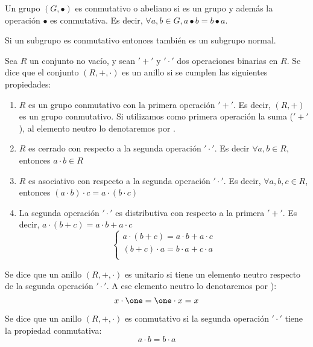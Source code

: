\begin{defn}
Un grupo $(G,\bullet)$ es conmutativo o abeliano si es un grupo y además la operación $\bullet$ es conmutativa. Es decir, $\forall a,b \in G, a\bullet b = b \bullet a$.
\end{defn}

\obs Si un subgrupo es conmutativo entonces también es un subgrupo normal.

\begin{defn}[Anillo]
Sea $R$ un conjunto no vacío, y sean $'+'$ y $'\cdot'$ dos operaciones binarias en $R$. Se dice que el conjunto $(R, +, \cdot )$ es un anillo si se cumplen las siguientes propiedades:

\begin{enumerate}
	\item $R$ es un grupo conmutativo con la primera operación $'+'$. Es decir, $(R,+)$ es un grupo conmutativo. Si utilizamos como primera operación la suma ($'+'$), al elemento neutro lo denotaremos por \zero.
	\item $R$ es cerrado con respecto a la segunda operación $'\cdot'$. Es decir $\forall a,b \in R$, entonces $a \cdot b \in R$
	\item $R$ es asociativo con respecto a la segunda operación $'\cdot'$. Es decir, $\forall a,b,c \in R$, entonces $(a\cdot b) \cdot c = a \cdot (b \cdot c)$
	\item La segunda operación $'\cdot'$ es distributiva con respecto a la primera $'+'$. Es decir, $a \cdot (b+c) = a\cdot b + a \cdot c$
	\[
	\left\{ \begin{array}{c}
	a \cdot (b+c) = a\cdot b + a \cdot c \\
	(b+c) \cdot a = b\cdot a + c\cdot a \\
	\end{array}
	\right.
	\]
\end{enumerate}
\end{defn}


\begin{defn}
	Se dice que un anillo $(R, +, \cdot)$ es unitario si tiene un elemento neutro respecto de la segunda operación $'\cdot'$. A ese elemento neutro lo denotaremos por \one):
	\[ x\cdot \one = \one \cdot x = x \]
\end{defn}

\begin{defn}
Se dice que un anillo $(R, +, \cdot)$ es conmutativo si la segunda operación $'\cdot'$ tiene la propiedad conmutativa:
\[ a\cdot b = b\cdot a \]
\end{defn}


